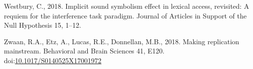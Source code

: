 \documentclass[]{elsarticle} %
\newlength{\cslhangindent}
\newenvironment{CSLReferences}[2] %
 {%
  \setlength{\parindent}{0pt}
  \ifodd #1 \everypar{\setlength{\hangindent}{\cslhangindent}}\ignorespaces\fi
  \ifnum #2 > 0
  \setlength{\parskip}{#2\baselineskip}
  \fi
 }%
 {}
\begin{document}
\begin{CSLReferences}{1}{0}
\leavevmode{}%
Westbury, C., 2018. Implicit sound symbolism effect in lexical access,
revisited: {A} requiem for the interference task paradigm. Journal of
Articles in Support of the Null Hypothesis 15, 1--12.

\leavevmode{}%
Zwaan, R.A., Etz, A., Lucas, R.E., Donnellan, M.B., 2018. Making
replication mainstream. Behavioral and Brain Sciences 41, E120.
doi:\href{https://doi.org/10.1017/S0140525X17001972}{10.1017/S0140525X17001972}

\end{CSLReferences}
\end{document}

